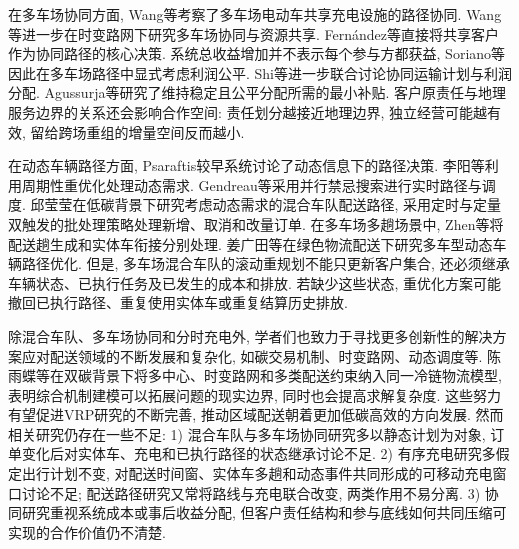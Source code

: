 \documentclass{setp-new}
\begin{document}
在多车场协同方面, Wang等\cite{ref:7}考察了多车场电动车共享充电设施的路径协同.
Wang等\cite{ref:25}进一步在时变路网下研究多车场协同与资源共享.
Fern\'{a}ndez等\cite{ref:49}直接将共享客户作为协同路径的核心决策.
系统总收益增加并不表示每个参与方都获益,
Soriano等\cite{ref:8}因此在多车场路径中显式考虑利润公平.
Shi等\cite{ref:9}进一步联合讨论协同运输计划与利润分配.
Agussurja等\cite{ref:10}研究了维持稳定且公平分配所需的最小补贴.
客户原责任与地理服务边界的关系还会影响合作空间:
责任划分越接近地理边界, 独立经营可能越有效,
留给跨场重组的增量空间反而越小.

在动态车辆路径方面, Psaraftis\cite{ref:14}较早系统讨论了动态信息下的路径决策.
李阳等\cite{ref:18}利用周期性重优化处理动态需求.
Gendreau等\cite{ref:22}采用并行禁忌搜索进行实时路径与调度.
邱莹莹\cite{ref:71}在低碳背景下研究考虑动态需求的混合车队配送路径,
采用定时与定量双触发的批处理策略处理新增、取消和改量订单.
在多车场多趟场景中, Zhen等\cite{ref:44}将配送趟生成和实体车衔接分别处理.
姜广田等\cite{ref:51}在绿色物流配送下研究多车型动态车辆路径优化.
但是, 多车场混合车队的滚动重规划不能只更新客户集合,
还必须继承车辆状态、已执行任务及已发生的成本和排放.
若缺少这些状态, 重优化方案可能撤回已执行路径、重复使用实体车或重复结算历史排放.

除混合车队、多车场协同和分时充电外,
学者们也致力于寻找更多创新性的解决方案应对配送领域的不断发展和复杂化,
如碳交易机制、时变路网、动态调度等.
陈雨蝶等\cite{ref:48}在双碳背景下将多中心、时变路网和多类配送约束纳入同一冷链物流模型,
表明综合机制建模可以拓展问题的现实边界, 同时也会提高求解复杂度.
这些努力有望促进VRP研究的不断完善, 推动区域配送朝着更加低碳高效的方向发展.
然而相关研究仍存在一些不足:
1) 混合车队与多车场协同研究多以静态计划为对象,
订单变化后对实体车、充电和已执行路径的状态继承讨论不足.
2) 有序充电研究多假定出行计划不变,
对配送时间窗、实体车多趟和动态事件共同形成的可移动充电窗口讨论不足;
配送路径研究又常将路线与充电联合改变, 两类作用不易分离.
3) 协同研究重视系统成本或事后收益分配,
但客户责任结构和参与底线如何共同压缩可实现的合作价值仍不清楚.
\end{document}

